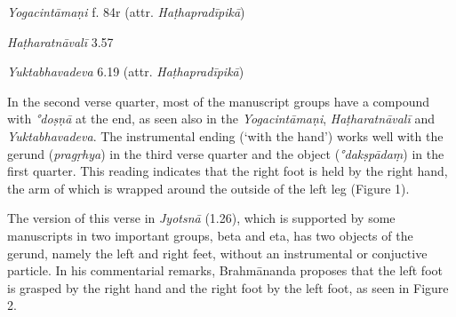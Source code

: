 \begin{ekdosis}
\begin{testimonia}[hp01_026]
\emph{Yogacintāmaṇi} f. 84r (attr. \emph{Haṭhapradīpikā})

\begin{versinnote}
\end{versinnote}

\emph{Haṭharatnāvalī} 3.57

\begin{versinnote}
\tl{\var{°dakṣapādo ] °dakṣapādaṃ P, °dakṣapādau t1}\\!}
\end{versinnote}

\emph{Yuktabhavadeva} 6.19 (attr. \emph{Haṭhapradīpikā})

\begin{versinnote}
\end{versinnote}

\end{testimonia}

\begin{philcomm}[hp01_026]
In the second verse quarter, most of the manuscript groups have a compound with \emph{°doṣṇā} at the end, as seen also in the \emph{Yogacintāmaṇi}, \emph{Haṭharatnāvalī} and \emph{Yuktabhavadeva}. The instrumental ending (`with the hand') works well with the gerund (\emph{pragṛhya}) in the third verse quarter and the object (\emph{°dakṣpādaṃ}) in the first quarter. This reading indicates that the right foot is held by the right hand, the arm of which is wrapped around the outside of the left leg (Figure 1). 

The version of this verse in \emph{Jyotsnā} (1.26), which is supported by some manuscripts in two important groups, beta and eta, has two objects of the gerund, namely the left and right feet, without an instrumental or conjuctive particle. In his commentarial remarks, Brahmānanda proposes that the left foot is grasped by the right hand and the right foot by the left foot, as seen in Figure 2.
\end{philcomm}


\end{ekdosis}
